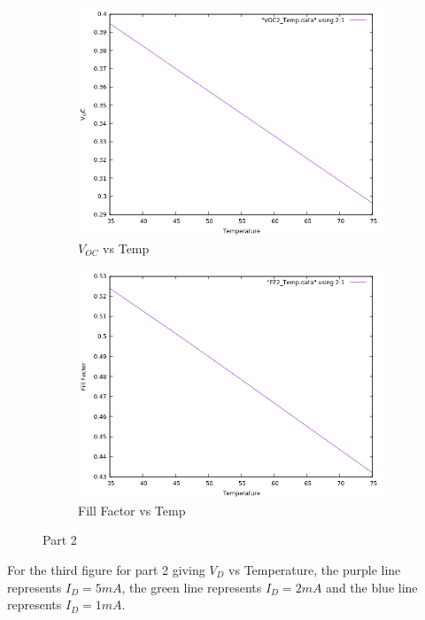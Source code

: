 \documentclass[12pt]{article}
\begin{document}
\begin{figure}[H]
	\begin{subfigure}[b]{0.6\linewidth}
		\includegraphics[width = \linewidth, trim = {0 0 0 0}, clip]{Pt2_VOCTemp.png}
		\caption{\( V_{OC} \) vs Temp}
	\end{subfigure} 
	\begin{subfigure}[b]{0.6\linewidth}
	   	\includegraphics[width = \linewidth, trim = {0 0 0 0}, clip]{Pt2_FFTemp.png}
		\caption{Fill Factor vs Temp}
	\end{subfigure}
	\caption{Part 2}
\end{figure}

For the third figure for part 2 giving \( V_D \) vs Temperature, the purple line represents \( I_D = 5mA \), the green line represents \( I_D = 2mA \) and the blue line represents \( I_D = 1mA \).\\
\end{document}
